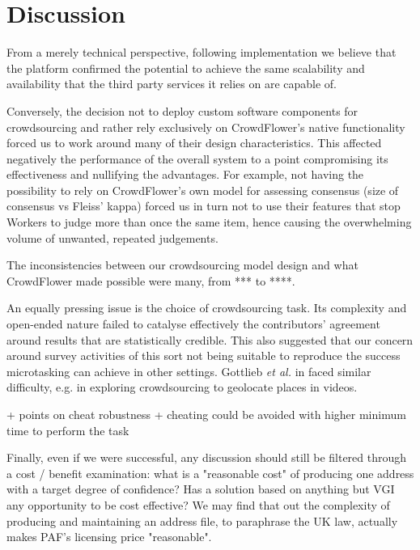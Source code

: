 \section{Discussion}

From a merely technical perspective, following implementation we believe that the platform confirmed the potential to achieve the same scalability and availability that the third party services it relies on are capable of.

Conversely, the decision not to deploy custom software components for crowdsourcing and rather rely exclusively on CrowdFlower's native functionality forced us to work around many of their design characteristics. This affected negatively the performance of the overall system to a point compromising its effectiveness and nullifying the advantages. For example, not having the possibility to rely on CrowdFlower's own model for assessing consensus (size of consensus vs Fleiss' kappa) forced us in turn not to use their features that stop Workers to judge more than once the same item, hence causing the overwhelming volume of unwanted, repeated judgements. 


The inconsistencies between our crowdsourcing model design and what CrowdFlower made possible were many, from *** to ****. 


An equally pressing issue is the choice of crowdsourcing task. Its complexity and open-ended nature failed to catalyse effectively the contributors' agreement around results that are statistically credible. This also suggested that our concern around survey activities of this sort not being suitable to reproduce the success microtasking can achieve in other settings. Gottlieb {\it et al.} in \cite{Gottlieb:2012fh} faced similar difficulty, e.g. in exploring crowdsourcing to geolocate places in videos.

+ points on cheat robustness
+ cheating could be avoided with higher minimum time to perform the task

Finally, even if we were successful, any discussion should still be filtered through a cost / benefit examination: what is a "reasonable cost" of producing one address with a target degree of confidence? Has a solution based on anything but VGI any opportunity to be cost effective? We may find that out the complexity of producing and maintaining an address file, to paraphrase the UK law, actually makes PAF's licensing price "reasonable".
